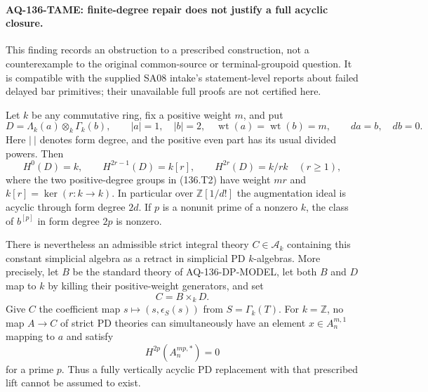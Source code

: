 \paragraph{AQ-136-TAME: finite-degree repair does not justify a full acyclic closure.}
This finding records an obstruction to a prescribed construction,
not a counterexample to the original common-source or terminal-groupoid
question. It is compatible with the supplied SA08 intake's
statement-level reports about failed delayed bar primitives; their
unavailable full proofs are not certified here.

Let $k$ be any commutative ring, fix a positive weight $m$, and put
\[
 D=\Lambda_k(a)\otimes_k\Gamma_k(b),\qquad
 |a|=1,\quad |b|=2,\quad \operatorname{wt}(a)=\operatorname{wt}(b)=m,
 \qquad da=b,\quad db=0.                                  \tag{136.T1}
\]
Here $|\ |$ denotes form degree, and the positive even part has
its usual divided powers. Then
\[
 H^0(D)=k,\qquad
 H^{2r-1}(D)=k[r],\qquad H^{2r}(D)=k/rk\quad(r\ge1),         \tag{136.T2}
\]
where the two positive-degree groups in (136.T2) have weight
$mr$ and $k[r]=\ker(r:k\to k)$. In particular over
$\mathbb Z[1/d!]$ the augmentation ideal is acyclic through
form degree $2d$. If $p$ is a nonunit prime of a nonzero $k$,
the class of $b^{[p]}$ in form degree $2p$ is nonzero.

There is nevertheless an admissible strict integral theory
$C\in\mathcal A_k$ containing this constant simplicial algebra as a retract
in simplicial PD $k$-algebras. More precisely, let $B$ be
the standard theory of AQ-136-DP-MODEL, let both $B$ and $D$
map to $k$ by killing their positive-weight generators, and set
\[
                             C=B\times_k D.               \tag{136.T3}
\]
Give $C$ the coefficient map
$s\mapsto(s,\epsilon_S(s))$ from $S=\Gamma_k(T)$.
For $k=\mathbb Z$, no map $A\to C$ of strict PD theories
can simultaneously have an element $x\in A_n^{m,1}$ mapping
to $a$ and satisfy
\[
                     H^{2p}(A_n^{mp,*})=0                 \tag{136.T4}
\]
for a prime $p$. Thus a fully vertically acyclic PD replacement
with that prescribed lift cannot be assumed to exist.

